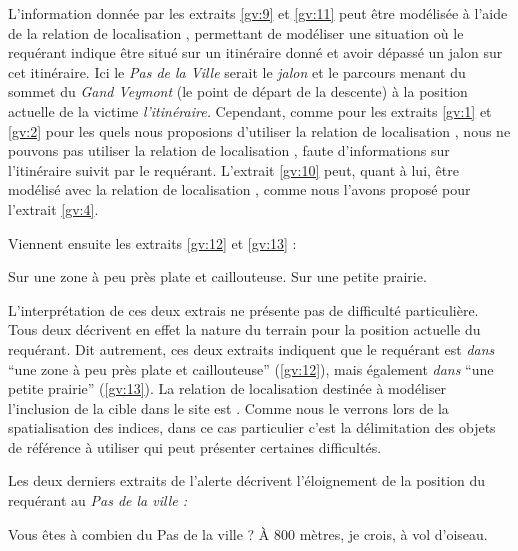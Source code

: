 L'information donnée par les extraits \ref{gv:9} et \ref{gv:11} peut
être modélisée à l'aide de la relation de localisation
, permettant de modéliser une
situation où le requérant indique être situé sur un itinéraire donné
et avoir dépassé un jalon sur cet itinéraire. Ici le \emph{Pas de la
  Ville} serait le \emph{jalon} et le parcours menant du sommet du
\emph{Gand Veymont} (\ie le point de départ de la descente) à la
position actuelle de la victime \emph{l'itinéraire.} Cependant, comme
pour les extraits \ref{gv:1} et \ref{gv:2} pour les quels nous
proposions d'utiliser la relation de localisation
, nous ne pouvons pas utiliser
la relation de localisation ,
faute d'informations sur l'itinéraire suivit par le
requérant. L'extrait \ref{gv:10} peut, quant à lui, être modélisé avec
la relation de localisation , comme nous
l'avons proposé pour l'extrait \ref{gv:4}.

Viennent ensuite les extraits \ref{gv:12} et \ref{gv:13} :
%
\begin{dialogue*}
  \Req {} Sur une zone à peu près plate et
  caillouteuse.  Sur une petite prairie.
\end{dialogue*}

L'interprétation de ces deux extrais ne présente pas de difficulté
particulière. Tous deux décrivent en effet la nature du terrain pour
la position actuelle du requérant. Dit autrement, ces deux extraits
indiquent que le requérant est \emph{dans} \enquote{une zone à peu
  près plate et caillouteuse} (\ref{gv:12}), mais également
\emph{dans} \enquote{une petite prairie} (\ref{gv:13}). La relation de
localisation destinée à modéliser l'inclusion de la cible dans le site
est . Comme nous le verrons lors de la
spatialisation des indices, dans ce cas particulier c'est la
délimitation des objets de référence à utiliser qui peut présenter
certaines difficultés.

Les deux derniers extraits de l'alerte décrivent l'éloignement de la
position du requérant au \emph{Pas de la ville :}
%
\begin{dialogue*}
  \Sec {} Vous êtes à combien du Pas de la ville ?
  \Req {} À 800 mètres, je crois, à vol d'oiseau.
\end{dialogue*}

